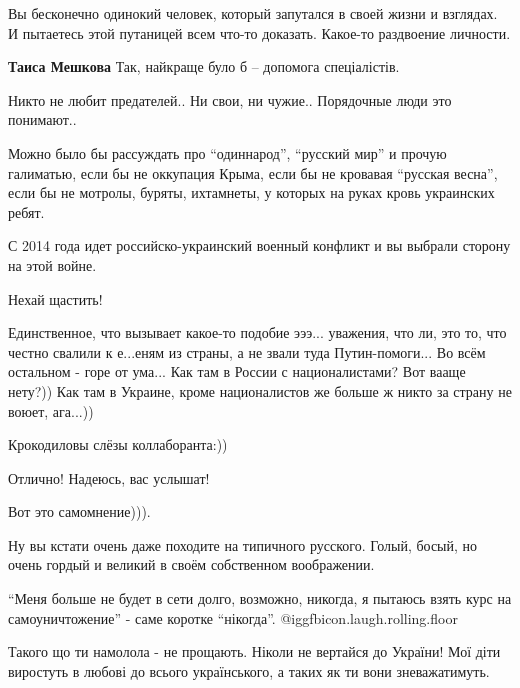 \begin{itemize}

Вы бесконечно одинокий человек, который запутался в своей жизни и взглядах. И
пытаетесь этой путаницей всем что-то доказать. Какое-то раздвоение личности.

\begin{itemize} %
\textbf{Таиса Мешкова} Так, найкраще було б – допомога спеціалістів.
\end{itemize} %

Никто не любит предателей.. Ни свои, ни чужие.. Порядочные люди это понимают..


Можно было бы рассуждать про \enquote{одиннарод}, \enquote{русский мир} и прочую галиматью,
если бы не оккупация Крыма, если бы не кровавая \enquote{русская весна}, если бы не
мотролы, буряты, ихтамнеты, у которых на руках кровь украинских ребят.

С 2014 года идет российско-украинский военный конфликт и вы выбрали сторону на
этой войне.

Нехай щастить!


Единственное, что вызывает какое-то подобие эээ... уважения, что ли, это то,
что честно свалили к е...еням из страны, а не звали туда Путин-помоги... Во
всём остальном - горе от ума... Как там в России с националистами? Вот вааще
нету?)) Как там в Украине, кроме националистов же больше ж никто за страну не
воюет, ага...))

Крокодиловы слёзы коллаборанта:))


Отлично!
Надеюсь, вас услышат!

Вот это самомнение))).


Ну вы кстати очень даже походите на типичного русского. Голый, босый, но очень
гордый и великий в своём собственном воображении.


\enquote{Меня больше не будет в сети долго, возможно, никогда, я пытаюсь взять курс на
самоуничтожение} - саме коротке \enquote{нікогда}.  @igg{fbicon.laugh.rolling.floor} 


Такого що ти намолола - не прощають. Ніколи не вертайся до України! Мої діти
виростуть в любові до всього українського, а таких як ти вони зневажатимуть.


\end{itemize}
